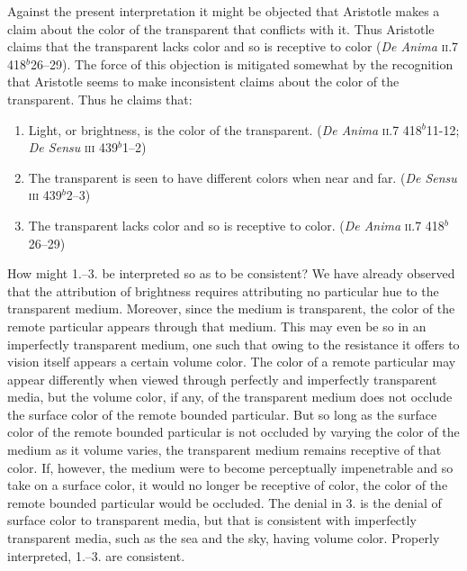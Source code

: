 \documentclass[12pt]{article}
\begin{document}
Against the present interpretation it might be objected that Aristotle makes a claim about the color of the transparent that conflicts with it. Thus Aristotle claims that the transparent lacks color and so is receptive to color (\emph{De Anima} \textsc{ii}.7 418\( ^{b} \)26--29). The force of this objection is mitigated somewhat by the recognition that Aristotle seems to make inconsistent claims about the color of the transparent. Thus he claims that:
\begin{enumerate}
	\item Light, or brightness, is the color of the transparent. (\emph{De Anima} \textsc{ii}.7 418\( ^{b} \)11-12; \emph{De Sensu} \textsc{iii} 439\( ^{b} \)1--2)
	\item The transparent is seen to have different colors when near and far. (\emph{De Sensu} \textsc{iii} 439\( ^{b} \)2--3)
	\item The transparent lacks color and so is receptive to color. (\emph{De Anima} \textsc{ii}.7 418\( ^{b} \)26--29)
\end{enumerate}
How might 1.--3. be interpreted so as to be consistent? We have already observed that the attribution of brightness requires attributing no particular hue to the transparent medium. Moreover, since the medium is transparent, the color of the remote particular appears through that medium. This may even be so in an imperfectly transparent medium, one such that owing to the resistance it offers to vision itself appears a certain volume color. The color of a remote particular may appear differently when viewed through perfectly and imperfectly transparent media, but the volume color, if any, of the transparent medium does not occlude the surface color of the remote bounded particular. But so long as the surface color of the remote bounded particular is not occluded by varying the color of the medium as it volume varies, the transparent medium remains receptive of that color. If, however, the medium were to become perceptually impenetrable and so take on a surface color, it would no longer be receptive of color, the color of the remote bounded particular would be occluded. The denial in 3. is the denial of surface color to transparent media, but that is consistent with imperfectly transparent media, such as the sea and the sky, having volume color. Properly interpreted, 1.--3. are consistent.
\end{document}

